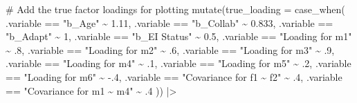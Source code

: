 \documentclass[
  letterpaper,
  DIV=11,
  numbers=noendperiod]{scrreprt}
\newenvironment{Shaded}{\begin{snugshade}}{\end{snugshade}}
\newcommand{\AttributeTok}[1]{\textcolor[rgb]{0.40,0.45,0.13}{#1}}
\newcommand{\CommentTok}[1]{\textcolor[rgb]{0.37,0.37,0.37}{#1}}
\newcommand{\DecValTok}[1]{\textcolor[rgb]{0.68,0.00,0.00}{#1}}
\newcommand{\FloatTok}[1]{\textcolor[rgb]{0.68,0.00,0.00}{#1}}
\newcommand{\FunctionTok}[1]{\textcolor[rgb]{0.28,0.35,0.67}{#1}}
\newcommand{\NormalTok}[1]{\textcolor[rgb]{0.00,0.23,0.31}{#1}}
\newcommand{\SpecialCharTok}[1]{\textcolor[rgb]{0.37,0.37,0.37}{#1}}
\newcommand{\StringTok}[1]{\textcolor[rgb]{0.13,0.47,0.30}{#1}}
\begin{document}
\begin{Shaded}
\begin{Highlighting}[]
  \CommentTok{\# Add the true factor loadings for plotting}
  \FunctionTok{mutate}\NormalTok{(}\AttributeTok{true\_loading =} \FunctionTok{case\_when}\NormalTok{(}
\NormalTok{    .variable }\SpecialCharTok{==} \StringTok{"b\_Age"} \SpecialCharTok{\textasciitilde{}} \FloatTok{1.11}\NormalTok{,}
\NormalTok{    .variable }\SpecialCharTok{==} \StringTok{"b\_Collab"} \SpecialCharTok{\textasciitilde{}} \FloatTok{0.833}\NormalTok{,}
\NormalTok{    .variable }\SpecialCharTok{==} \StringTok{"b\_Adapt"} \SpecialCharTok{\textasciitilde{}} \DecValTok{1}\NormalTok{,}
\NormalTok{    .variable }\SpecialCharTok{==} \StringTok{"b\_EI Status"} \SpecialCharTok{\textasciitilde{}} \FloatTok{0.5}\NormalTok{,}
\NormalTok{    .variable }\SpecialCharTok{==} \StringTok{"Loading for m1"} \SpecialCharTok{\textasciitilde{}}\NormalTok{ .}\DecValTok{8}\NormalTok{,}
\NormalTok{    .variable }\SpecialCharTok{==} \StringTok{"Loading for m2"} \SpecialCharTok{\textasciitilde{}}\NormalTok{ .}\DecValTok{6}\NormalTok{,}
\NormalTok{    .variable }\SpecialCharTok{==} \StringTok{"Loading for m3"} \SpecialCharTok{\textasciitilde{}}\NormalTok{ .}\DecValTok{9}\NormalTok{,}
\NormalTok{    .variable }\SpecialCharTok{==} \StringTok{"Loading for m4"} \SpecialCharTok{\textasciitilde{}}\NormalTok{ .}\DecValTok{1}\NormalTok{,}
\NormalTok{    .variable }\SpecialCharTok{==} \StringTok{"Loading for m5"} \SpecialCharTok{\textasciitilde{}}\NormalTok{ .}\DecValTok{2}\NormalTok{,}
\NormalTok{    .variable }\SpecialCharTok{==} \StringTok{"Loading for m6"} \SpecialCharTok{\textasciitilde{}} \SpecialCharTok{{-}}\NormalTok{.}\DecValTok{4}\NormalTok{,}
\NormalTok{    .variable }\SpecialCharTok{==} \StringTok{"Covariance for f1 \textasciitilde{} f2"} \SpecialCharTok{\textasciitilde{}}\NormalTok{ .}\DecValTok{4}\NormalTok{,}
\NormalTok{    .variable }\SpecialCharTok{==} \StringTok{"Covariance for m1 \textasciitilde{} m4"} \SpecialCharTok{\textasciitilde{}}\NormalTok{ .}\DecValTok{4}
\NormalTok{  )) }\SpecialCharTok{|\textgreater{}}


\end{Highlighting}
\end{Shaded}
\end{document}
